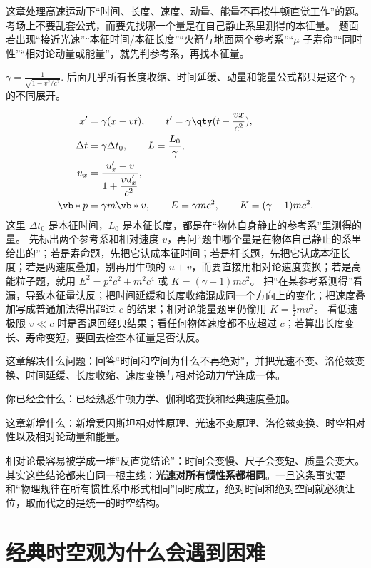 \documentclass[lang=cn,11pt]{elegantbook}
\newcommand{\bridge}[1]{\begin{note}#1\end{note}}
\newcommand{\chapterroadmap}[3]{%
\begin{introduction}
 \item {\heiti 这章解决什么问题：}#1
 \item {\heiti 你已经会什么：}#2
 \item {\heiti 这章新增什么：}#3
\end{introduction}}
\begin{document}
\begin{skill}[第21章冲刺总手册]\label{sk:phys-ch21-overview}
 这章处理高速运动下“时间、长度、速度、动量、能量不再按牛顿直觉工作”的题。考场上不要乱套公式，而要先找哪一个量是在自己静止系里测得的本征量。
 题面若出现“接近光速”“本征时间/本征长度”“火箭与地面两个参考系”“\(\mu\) 子寿命”“同时性”“相对论动量或能量”，就先判参考系，再找本征量。

 \(\gamma=\frac{1}{\sqrt{1-v^2/c^2}}.\) 
后面几乎所有长度收缩、时间延缓、动量和能量公式都只是这个 \(\gamma\) 的不同展开。

\[
\begin{aligned}
x'&=\gamma(x-vt),\qquad
t'=\gamma\qty(t-\frac{vx}{c^2}),\\
\Delta t&=\gamma \Delta t_0,\qquad
L=\frac{L_0}{\gamma},\\
u_x&=\frac{u_x'+v}{1+\dfrac{vu_x'}{c^2}},\\
\vb*{p}&=\gamma m\vb*{v},\qquad
E=\gamma mc^2,\qquad
K=(\gamma-1)mc^2.
\end{aligned}
\]
这里 \(\Delta t_0\) 是本征时间，\(L_0\) 是本征长度，都是在“物体自身静止的参考系”里测得的量。
 先标出两个参考系和相对速度 \(v\)，再问“题中哪个量是在物体自己静止的系里给出的”；若是寿命题，先把它认成本征时间；若是杆长题，先把它认成本征长度；若是两速度叠加，别再用牛顿的 \(u+v\)，而要直接用相对论速度变换；若是高能粒子题，就用 \(E^2=p^2c^2+m^2c^4\) 或 \(K=(\gamma-1)mc^2\)。
 把“在某参考系测得”看漏，导致本征量认反；把时间延缓和长度收缩混成同一个方向上的变化；把速度叠加写成普通加法得出超过 \(c\) 的结果；相对论能量题里仍偷用 \(K=\frac12 mv^2\)。
 看低速极限 \(v\ll c\) 时是否退回经典结果；看任何物体速度都不应超过 \(c\)；若算出长度变长、寿命变短，要回去检查本征量是否认反。
\end{skill}

\chapterroadmap
{回答“时间和空间为什么不再绝对”，并把光速不变、洛伦兹变换、时间延缓、长度收缩、速度变换与相对论动力学连成一体。}
{已经熟悉牛顿力学、伽利略变换和经典速度叠加。}
{新增爱因斯坦相对性原理、光速不变原理、洛伦兹变换、时空相对性以及相对论动量和能量。}

\bridge{相对论最容易被学成一堆“反直觉结论”：时间会变慢、尺子会变短、质量会变大。其实这些结论都来自同一根主线：\textbf{光速对所有惯性系都相同}。一旦这条事实要和“物理规律在所有惯性系中形式相同”同时成立，绝对时间和绝对空间就必须让位，取而代之的是统一的时空结构。}

\section{经典时空观为什么会遇到困难}
\end{document}
